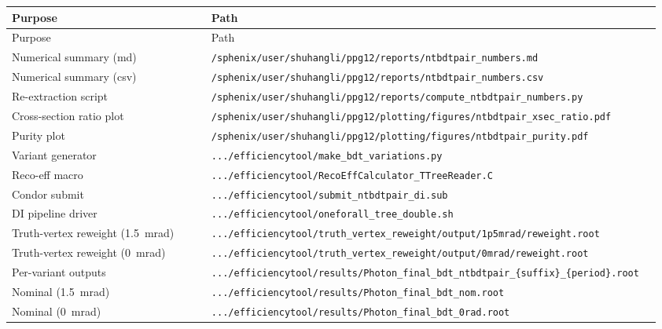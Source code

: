 \documentclass[11pt]{article}
\begin{document}
{\small
\begin{longtable}{@{}p{0.30\linewidth} p{0.66\linewidth}@{}}
\toprule
Purpose & Path \\
\midrule
\endfirsthead
\toprule
Purpose & Path \\
\midrule
\endhead
\bottomrule
\endfoot

Numerical summary (md) &
  \texttt{/sphenix/user/shuhangli/ppg12/reports/ntbdtpair\_numbers.md} \\
Numerical summary (csv) &
  \texttt{/sphenix/user/shuhangli/ppg12/reports/ntbdtpair\_numbers.csv} \\
Re-extraction script &
  \texttt{/sphenix/user/shuhangli/ppg12/reports/compute\_ntbdtpair\_numbers.py} \\
Cross-section ratio plot &
  \texttt{/sphenix/user/shuhangli/ppg12/plotting/figures/ntbdtpair\_xsec\_ratio.pdf} \\
Purity plot &
  \texttt{/sphenix/user/shuhangli/ppg12/plotting/figures/ntbdtpair\_purity.pdf} \\
\midrule
Variant generator &
  \texttt{.../efficiencytool/make\_bdt\_variations.py} \\
Reco-eff macro &
  \texttt{.../efficiencytool/RecoEffCalculator\_TTreeReader.C} \\
Condor submit &
  \texttt{.../efficiencytool/submit\_ntbdtpair\_di.sub} \\
DI pipeline driver &
  \texttt{.../efficiencytool/oneforall\_tree\_double.sh} \\
Truth-vertex reweight (1.5~mrad) &
  \texttt{.../efficiencytool/truth\_vertex\_reweight/output/1p5mrad/reweight.root} \\
Truth-vertex reweight (0~mrad) &
  \texttt{.../efficiencytool/truth\_vertex\_reweight/output/0mrad/reweight.root} \\
\midrule
Per-variant outputs &
  \texttt{.../efficiencytool/results/Photon\_final\_bdt\_ntbdtpair\_\{suffix\}\_\{period\}.root} \\
Nominal (1.5~mrad) &
  \texttt{.../efficiencytool/results/Photon\_final\_bdt\_nom.root} \\
Nominal (0~mrad) &
  \texttt{.../efficiencytool/results/Photon\_final\_bdt\_0rad.root} \\
\bottomrule
\end{longtable}
}
\end{document}
